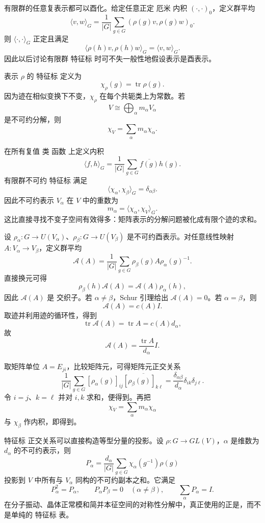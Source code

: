 有限群的任意复表示都可以酉化。给定任意正定 厄米 内积 $(\cdot,\cdot)_0$，定义群平均
\[
\langle v,w\rangle_G
=\frac1{|G|}\sum_{g\in G}
(\rho(g)v,\rho(g)w)_0.
\]
则 $\langle\cdot,\cdot\rangle_G$ 正定且满足
\[
\langle\rho(h)v,\rho(h)w\rangle_G
=\langle v,w\rangle_G.
\]
因此以后讨论有限群 特征标 时可不失一般性地假设表示是酉表示。

表示 $\rho$ 的 特征标 定义为
\[
\chi_\rho(g)=\operatorname{tr}\rho(g).
\]
因为迹在相似变换下不变，$\chi_\rho$ 在每个共轭类上为常数。若
\[
V\cong \bigoplus_\alpha m_\alpha V_\alpha
\]
是不可约分解，则
\[
\chi_V=\sum_\alpha m_\alpha\chi_\alpha.
\]

在所有复值 类 函数 上定义内积
\begin{equation}
\langle f,h\rangle_G
=\frac1{|G|}\sum_{g\in G}
\overline{f(g)}h(g).
\label{eq:character-inner-product}
\end{equation}
有限群不可约 特征标 满足
\begin{equation}
\langle\chi_\alpha,\chi_\beta\rangle_G
=\delta_{\alpha\beta}.
\label{eq:character-orthogonality}
\end{equation}
因此不可约表示 $V_\alpha$ 在 $V$ 中的重数为
\begin{equation}
m_\alpha
=\langle\chi_\alpha,\chi_V\rangle_G.
\label{eq:character-multiplicity}
\end{equation}
这比直接寻找不变子空间有效得多：矩阵表示的分解问题被化成有限个迹的求和。

设 $\rho_\alpha:G\to U(V_\alpha)$、$\rho_\beta:G\to U(V_\beta)$ 是不可约酉表示。对任意线性映射 $A:V_\alpha\to V_\beta$，定义群平均
\[
\mathcal A(A)
=\frac1{|G|}\sum_{g\in G}
\rho_\beta(g)A\rho_\alpha(g)^{-1}.
\]
直接换元可得
\[
\rho_\beta(h)\mathcal A(A)
=\mathcal A(A)\rho_\alpha(h),
\]
因此 $\mathcal A(A)$ 是 交织子。若 $\alpha\neq\beta$，Schur 引理给出 $\mathcal A(A)=0$。若 $\alpha=\beta$，则
\[
\mathcal A(A)=c(A)I.
\]
取迹并利用迹的循环性，得到
\[
\operatorname{tr}\mathcal A(A)
=\operatorname{tr}A
=c(A)d_\alpha,
\]
故
\[
\mathcal A(A)=\frac{\operatorname{tr}A}{d_\alpha}I.
\]

取矩阵单位 $A=E_{ji}$，比较矩阵元，可得矩阵元正交关系
\[
\frac1{|G|}\sum_{g\in G}
[\rho_\alpha(g)]_{ij}
\overline{[\rho_\beta(g)]_{k\ell}}
=
\frac{\delta_{\alpha\beta}}{d_\alpha}
\delta_{ik}\delta_{j\ell}.
\]
令 $i=j$、$k=\ell$ 并对 $i,k$ 求和，便得到。再把
\[
\chi_V=\sum_\alpha m_\alpha\chi_\alpha
\]
与 $\chi_\beta$ 作内积，即得到。

特征标 正交关系可以直接构造等型分量的投影。设 $\rho:G\to GL(V)$，$\alpha$ 是维数为 $d_\alpha$ 的不可约表示，则
\begin{equation}
P_\alpha
=
\frac{d_\alpha}{|G|}
\sum_{g\in G}
\chi_\alpha(g^{-1})\rho(g)
\label{eq:character-projector}
\end{equation}
投影到 $V$ 中所有与 $V_\alpha$ 同构的不可约副本之和。它满足
\[
P_\alpha^2=P_\alpha,
\qquad
P_\alpha P_\beta=0\quad(\alpha\neq\beta),
\qquad
\sum_\alpha P_\alpha=I.
\]
在分子振动、晶体正常模和简并本征空间的对称性分解中，真正使用的正是，而不是单纯的 特征标 表。

